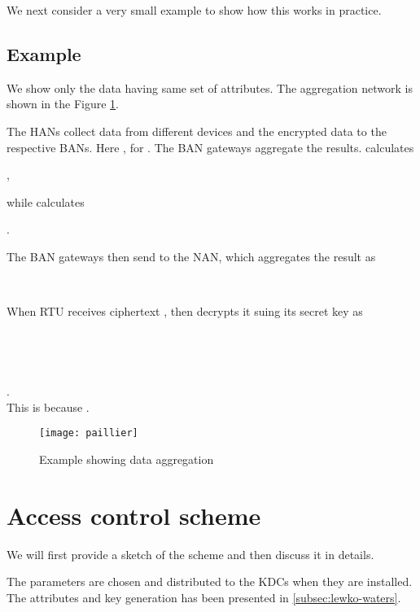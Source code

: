 \documentclass[conference]{IEEEtran}[10pt]
\begin{document}
We next consider a very small example to show how this works in practice.  

\subsection{Example}
We show only the data having same set of attributes. 
The aggregation network is shown in the Figure \ref{fig:nan}. 

The HANs collect data from different devices and the encrypted data  to the respective BANs. 
Here , for .
The BAN gateways aggregate the results. 
 calculates 
\begin{center}
,
\end{center} 
 while
 calculates 
\begin{center}
.
\end{center} 
The BAN gateways then send to the NAN, which aggregates the result as\\

\begin{center}
\\
\vspace*{.1cm}

\end{center}

When RTU receives ciphertext , then decrypts it suing its secret key  as\\
\vspace*{.1cm}
\\
\\
\\
\\
.\\
This is because .

\begin{figure}[htb]
\begin{centering}
\texttt{[image: paillier]}
\caption{
Example showing data aggregation
}
\label{fig:nan}
\end{centering}
\end{figure}

\section{Access control scheme}
\label{sec:access-control}
We will first provide a sketch of the scheme and then discuss it in details.  

The parameters are chosen and distributed to the KDCs when they are installed. 
The attributes and key generation has been presented in \ref{subsec:lewko-waters}. 
\end{document}
